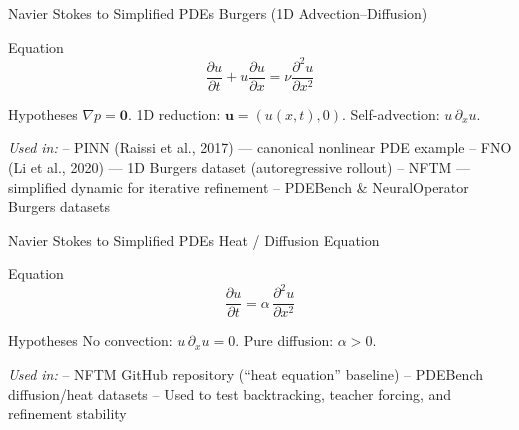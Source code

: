 \begin{frame}{Navier Stokes to Simplified PDEs}
\small
\textcolor{red_unipd}{\Large Burgers (1D Advection–Diffusion)}

\vspace{0.6em}

\begin{alertblock}{Equation}
\[
\dfrac{\partial u}{\partial t} + u\dfrac{\partial u}{\partial x}
= \nu\dfrac{\partial^2 u}{\partial x^2}
\]
\end{alertblock}

\begin{block}{Hypotheses}
\(\nabla p=\mathbf{0}\). \quad
1D reduction: \(\mathbf{u}=(u(x,t),0)\). \quad
Self-advection: \(u\,\partial_x u\).
\end{block}

\vspace{0.5em}
\textit{Used in:}  
– PINN (Raissi et al., 2017) — canonical nonlinear PDE example  
– FNO (Li et al., 2020) — 1D Burgers dataset (autoregressive rollout)  
– NFTM — simplified dynamic for iterative refinement  
– PDEBench \& NeuralOperator Burgers datasets
\end{frame}


\begin{frame}{Navier Stokes to Simplified PDEs}
\small
\textcolor{red_unipd}{\Large Heat / Diffusion Equation}

\vspace{0.6em}

\begin{alertblock}{Equation}
\[
\dfrac{\partial u}{\partial t} =
\alpha\,\dfrac{\partial^2 u}{\partial x^2}
\]
\end{alertblock}

\begin{block}{Hypotheses}
No convection: \(u\,\partial_x u = 0\). \quad
Pure diffusion: \(\alpha>0\).
\end{block}

\vspace{0.5em}
\textit{Used in:}  
– NFTM GitHub repository (“heat equation” baseline)  
– PDEBench diffusion/heat datasets  
– Used to test backtracking, teacher forcing, and refinement stability
\end{frame}


